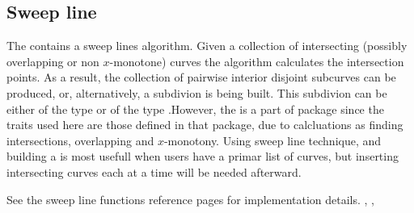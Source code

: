 \subsection*{Sweep line}
The  contains a sweep lines algorithm. 
Given a collection of intersecting (possibly overlapping or non $x$-monotone)
curves the algorithm calculates the intersection points. As a result, the
collection of pairwise interior disjoint subcurves can be produced, or,
alternatively, a subdivion is being built. 
This subdivion can be either of the type  or of the 
type .However, the  is a part of 
 package since 
the traits used here are those defined in that package, due to calcluations as finding 
intersections, overlapping and $x$-monotony. 
Using sweep line technique, and building a  is most 
usefull when users have a primar list of curves, 
but inserting intersecting curves each at a time will be needed afterward.
 
See the sweep line functions reference pages for implementation details.  
,
 ,


